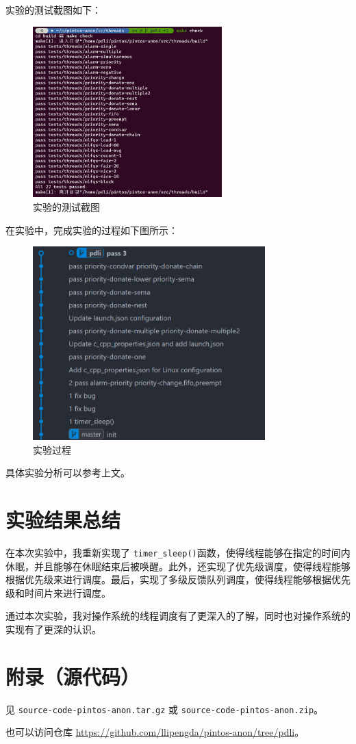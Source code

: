 \documentclass{article}
\begin{document}
实验的测试截图如下：

\begin{figure}[H]
  \centering
  \includegraphics[width=0.65\textwidth]{img/res.png}
  \caption{实验的测试截图}
\end{figure}

在实验中，完成实验的过程如下图所示：

\begin{figure}[H]
  \centering
  \includegraphics[width=0.8\textwidth]{img/flow.png}
  \caption{实验过程}
\end{figure}

具体实验分析可以参考上文。

\section{实验结果总结}

在本次实验中，我重新实现了 \texttt{timer\_sleep()}函数，使得线程能够在指定的时间内休眠，并且能够在休眠结束后被唤醒。此外，还实现了优先级调度，使得线程能够根据优先级来进行调度。最后，实现了多级反馈队列调度，使得线程能够根据优先级和时间片来进行调度。

通过本次实验，我对操作系统的线程调度有了更深入的了解，同时也对操作系统的实现有了更深的认识。

\normalsize

\section{附录（源代码）}

见 \texttt{source-code-pintos-anon.tar.gz} 或 \texttt{source-code-pintos-anon.zip}。

也可以访问仓库 \url{https://github.com/llipengda/pintos-anon/tree/pdli}。

\normalsize
\end{document}
